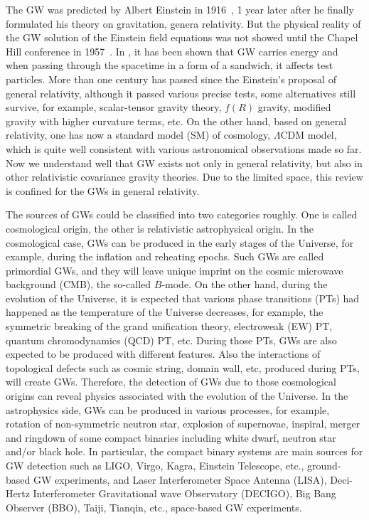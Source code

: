 \documentclass[a4paper,11pt]{article}
\begin{document}
The GW was predicted by Albert Einstein in 1916~\cite{Einstein:1916cc,Einstein:1918btx}, 1 year later after he finally formulated his theory on gravitation, genera relativity. But the physical reality of the GW solution of the Einstein field equations was not showed until the Chapel Hill conference in 1957~\cite{Saulson:2010zz}. In \cite{Bondi:1957dt,Bondi:1958aj}, it has been shown that GW carries energy and when passing through the spacetime in a form of a sandwich, it affects test particles. More than one century has passed since the Einstein's proposal of general relativity, although it passed various precise tests, some alternatives still survive, for example, scalar-tensor gravity theory, $f(R)$ gravity, modified gravity with higher curvature terms, etc. On the other hand, based on general relativity, one has now a standard model (SM) of cosmology, $\Lambda$CDM model, which is quite well consistent with various astronomical  observations made so far. Now we understand well that GW exists not only in general relativity, but also in other  relativistic covariance gravity theories. Due to the limited space, this review is confined for the GWs in general relativity.

The sources of GWs could be classified into two categories roughly. One is called cosmological origin, the other is relativistic astrophysical origin. In the cosmological case, GWs can be produced in the early stages of the Universe, for example, during the inflation and reheating epochs. Such GWs are called primordial GWs, and they will leave unique imprint on the cosmic microwave background (CMB), the so-called $B$-mode. On the other hand, during the evolution of the Universe, it is expected that various phase transitions (PTs) had happened as the temperature of the Universe decreases, for example, the symmetric breaking of the grand unification theory, electroweak (EW) PT, quantum chromodynamics (QCD) PT, etc. During those PTs, GWs are also expected to be produced with different features.  Also the interactions of topological defects such as cosmic string, domain wall, etc, produced during PTs, will create GWs. Therefore, the detection of GWs due to those cosmological origins can reveal physics associated with the evolution of the Universe. In the astrophysics side, GWs can be produced in various processes, for example, rotation of non-symmetric neutron star, explosion of supernovae, inspiral, merger and ringdown of some compact binaries including white dwarf, neutron star and/or black hole. In particular, the compact binary systems are main sources for GW detection such as LIGO, Virgo, Kagra, Einstein Telescope, etc., ground-based GW experiments, and Laser Interferometer Space Antenna (LISA), Deci-Hertz Interferometer Gravitational wave Observatory (DECIGO), Big Bang Observer (BBO), Taiji, Tianqin, etc., space-based GW experiments.
\end{document}
